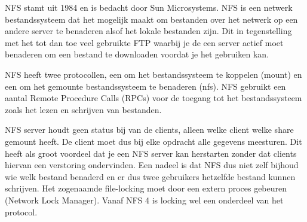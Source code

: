 NFS stamt uit 1984 en is bedacht door Sun Microsystems. NFS is een netwerk bestandssysteem dat het mogelijk maakt om bestanden over het netwerk op een andere server te benaderen alsof het lokale bestanden zijn. Dit in tegenstelling met het tot dan toe veel gebruikte FTP waarbij je de een server actief moet benaderen om een bestand te downloaden voordat je het gebruiken kan.

NFS heeft twee protocollen, een om het bestandssysteem te koppelen (mount) en een om het gemounte bestandssysteem te benaderen (nfs). NFS gebruikt een aantal Remote Procedure Calls (RPCs) voor de toegang tot het bestandssysteem zoals het lezen en schrijven van bestanden.

NFS server houdt geen status bij van de clients, alleen welke client welke share gemount heeft. De client moet dus bij elke opdracht alle gegevens meesturen. Dit heeft als groot voordeel dat je een NFS server kan herstarten zonder dat clients hiervan een verstoring ondervinden. Een nadeel is dat NFS dus niet zelf bijhoud wie welk bestand benaderd en er dus twee gebruikers hetzelfde bestand kunnen schrijven. Het zogenaamde file-locking moet door een extern proces gebeuren (Network Lock Manager). Vanaf NFS 4 is locking wel een onderdeel van het protocol.
